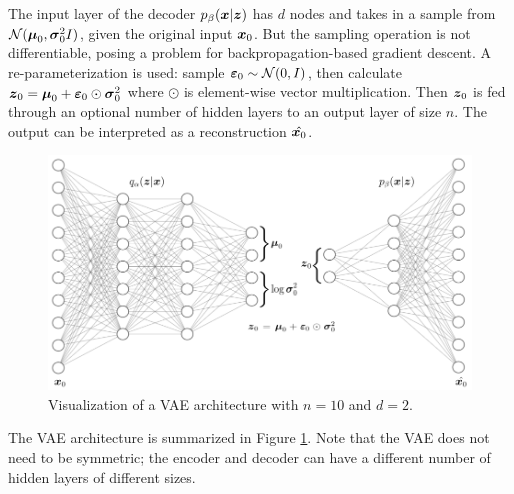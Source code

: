 The input layer of the decoder $p_\beta(\boldsymbol{x} | \boldsymbol{z})$ has $d$ nodes and takes in a sample from $\mathcal{N}(\boldsymbol{\mu}_0, \boldsymbol{\sigma}_0^2I)$, given the original input $\boldsymbol{x}_0$. But the sampling operation is not differentiable, posing a problem for backpropagation-based gradient descent. A re-parameterization is used: sample $\boldsymbol{\varepsilon}_0 \sim \mathcal{N}(0,I)$, then calculate $\boldsymbol{z}_0 = \boldsymbol{\mu}_0 + \boldsymbol{\varepsilon}_0 \odot \boldsymbol{\sigma}_0^2$ where $\odot$ is element-wise vector multiplication. Then $\boldsymbol{z}_0$ is fed through an optional number of hidden layers to an output layer of size $n$. The output can be interpreted as a reconstruction $\hat{\boldsymbol{x}_0}$.

\begin{figure}[h]
  \centering
  \includegraphics[width=.95\textwidth]{img/vae_visual.png}
  \caption{Visualization of a VAE architecture with $n=10$ and $d=2$.}
  \label{fig:vae_visual}
\end{figure}
The VAE architecture is summarized in Figure \ref{fig:vae_visual}. Note that the VAE does not need to be symmetric; the encoder and decoder can have a different number of hidden layers of different sizes.


